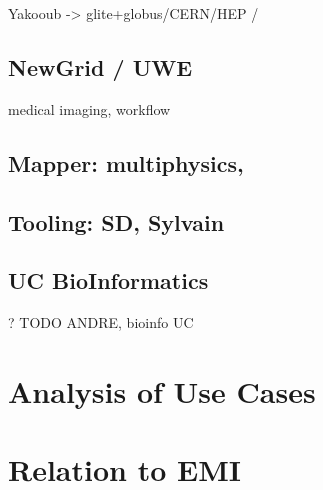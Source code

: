 \documentclass[3p,twocolumn]{article}
\begin{document}
  Yakooub -> glite+globus/CERN/HEP /


 \subsection{NewGrid / UWE}

  medical imaging, workflow


 \subsection{Mapper: multiphysics,}


 \subsection{Tooling: SD, Sylvain}


 \subsection{UC BioInformatics}

  ? TODO ANDRE, bioinfo UC


\section{Analysis of Use Cases}


\section{Relation to EMI}




\end{document}
